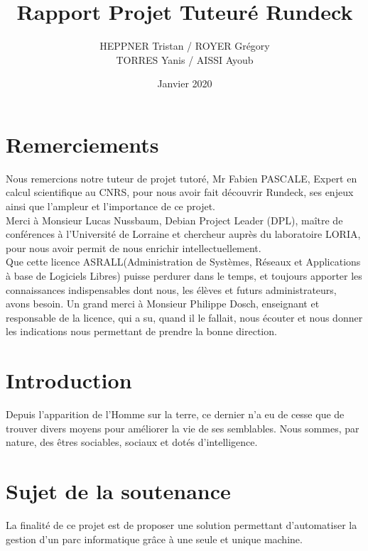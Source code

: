 \documentclass[12pt]{article}
\title{Rapport Projet Tuteuré Rundeck}
\author{HEPPNER Tristan / ROYER Grégory
\\
TORRES Yanis / AISSI Ayoub }
\date{Janvier 2020}
\begin{document}
\maketitle
\newpage
\tableofcontents
\newpage
\section{Remerciements}

Nous remercions notre tuteur de projet tutoré, Mr Fabien PASCALE, Expert en calcul scientifique au CNRS, pour nous avoir fait découvrir Rundeck, ses enjeux ainsi que l'ampleur et l'importance de ce projet.
\vspace{0.5cm}
\\
Merci  à  Monsieur Lucas  Nussbaum,  Debian  Project  Leader  (DPL),  maître  de conférences à l'Université de Lorraine et chercheur auprès du laboratoire LORIA, pour nous avoir permit de nous enrichir intellectuellement.
\vspace{0.5cm}
\\
Que cette licence ASRALL(Administration de Systèmes, Réseaux et Applications à base  de  Logiciels  Libres)  puisse  perdurer  dans  le  temps,  et  toujours  apporter  les connaissances indispensables dont nous, les élèves et futurs administrateurs, avons besoin. Un grand merci à Monsieur Philippe Dosch, enseignant et responsable de la licence, qui a su, quand il le fallait, nous écouter et nous donner les indications nous permettant de prendre la bonne direction.
\newpage
\section{Introduction}
Depuis l’apparition de l’Homme sur la terre, ce dernier n’a eu de cesse que de trouver divers moyens pour améliorer la vie de ses semblables. Nous sommes,  par  nature, des  êtres sociables, sociaux et dotés d’intelligence.

\section{Sujet de la soutenance}

La finalité de ce projet est de proposer une solution permettant d'automatiser la gestion d'un parc informatique grâce à une seule et unique machine.
\end{document}
